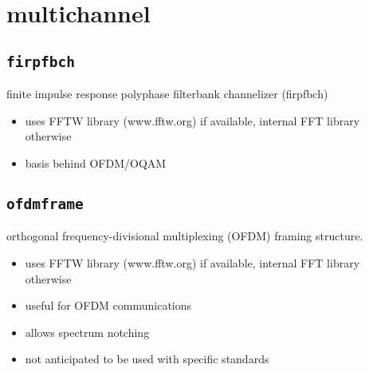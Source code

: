 %
%

\newpage
\section{multichannel}
\label{module:multichannel}

\subsection{{\tt firpfbch}}
\label{module:multichannel:firpfbch}
finite impulse response polyphase filterbank channelizer (firpfbch)
\begin{itemize}
\item uses FFTW library (www.fftw.org) if available, internal FFT library
      otherwise
\item basis behind OFDM/OQAM
\end{itemize}


\subsection{{\tt ofdmframe}}
\label{module:multichannel:ofdmframe}
orthogonal frequency-divisional multiplexing (OFDM) framing structure.
\begin{itemize}
\item uses FFTW library (www.fftw.org) if available, internal FFT library
      otherwise
\item useful for OFDM communications
\item allows spectrum notching
\item not anticipated to be used with specific standards
\end{itemize}



